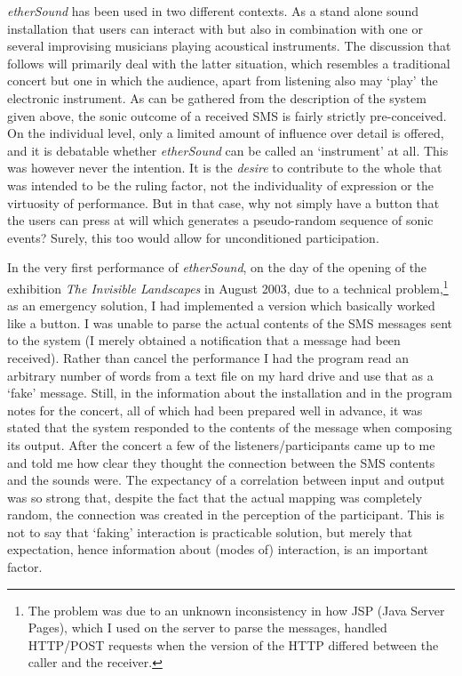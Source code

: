\emph{etherSound} has been used in two different contexts. As a stand alone sound installation that users can interact with but also in combination with one or several improvising musicians playing acoustical instruments. The discussion that follows will primarily deal with the latter situation, which resembles a traditional concert but one in which the audience, apart from listening also may `play' the electronic instrument. As can be gathered from the description of the system given above, the sonic outcome of a received SMS is fairly strictly pre-conceived. On the individual level, only a limited amount of influence over detail is offered, and it is debatable whether \emph{etherSound} can be called an `instrument' at all. 
This was however never the intention. It is the \emph{desire} to contribute to the whole that was intended to be the ruling factor, not the individuality of expression or the virtuosity of performance. But in that case, why not simply have a button that the users can press at will which generates a pseudo-random sequence of sonic events? Surely, this too would allow for unconditioned participation.
 
In the very first performance of \emph{etherSound}, on the day of the opening of the exhibition \emph{The Invisible Landscapes} in August 2003, due to a technical problem,\footnote{The problem was due to an   unknown inconsistency in how JSP (Java Server Pages), which I used   on the server to parse the messages, handled HTTP/POST requests when   the version of the HTTP differed between the caller and the   receiver.} as an emergency solution, I had implemented a version which basically worked like a button. I was unable to parse the actual contents of the SMS messages sent to the system (I merely obtained a notification that a message had been received). Rather than cancel the performance I had the program read an arbitrary number of words from a text file on my hard drive and use that as a `fake' message. Still, in the information about the installation and in the program notes for the concert, all of which had been prepared well in advance, it was stated that the system responded to the contents of the message when composing its output. After the concert a few of the listeners/participants came up to me and told me how clear they thought the connection between the SMS contents and the sounds were.  The expectancy of a correlation between input and output was so strong that, despite the fact that the actual mapping was completely random, the connection was created in the perception of the participant. This is not to say that `faking' interaction is practicable solution, but merely that expectation, hence information about (modes of) interaction, is an important factor. 

